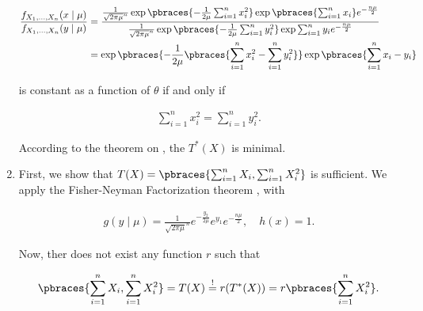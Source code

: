 \begin{solution}
\begin{enumerate}[label = (\alph*)]
    \begin{align*}
        \frac
        {
            f_{X_1, \dots, X_n}(x \mid \mu)
        }{
            f_{X_1, \dots, X_n}(y \mid \mu)
        }
        & =
        \frac
        {
            \frac{1}{\sqrt{2 \pi \mu}^n}
            \exp
            \pbraces
            {
                -\frac{1}{2 \mu}
                \sum_{i=1}^n
                    x_i^2
            }
            \exp \pbraces{\sum_{i=1}^n x_i}
            e^{-\frac{n \mu}{2}}
        }{
            \frac{1}{\sqrt{2 \pi \mu}^n}
            \exp
            \pbraces
            {
                -\frac{1}{2 \mu}
                \sum_{i=1}^n
                    y_i^2
            }
            \exp \sum_{i=1}^n y_i
            e^{-\frac{n \mu}{2}}
        } \\
        & =
        \exp
        \pbraces
        {
            -\frac{1}{2 \mu}
            \pbraces
            {
                \sum_{i=1}^n
                    x_i^2
                -
                \sum_{i=1}^n
                    y_i^2
            }
        }
        \exp \pbraces{\sum_{i=1}^n x_i - y_i}
    \end{align*}

    is constant as a function of $\theta$ if and only if

    \begin{align*}
        \sum_{i=1}^n
            x_i^2
        =
        \sum_{i=1}^n
            y_i^2.
    \end{align*}

    According to the theorem on \cite[lecture 8, slide 29]{EStat}, the $T^\ast(X)$ is minimal.

    \item First, we show that $T(X) = \pbraces{\sum_{i=1}^n X_i, \sum_{i=1}^n X_i^2}$ is sufficient.
    We apply the Fisher-Neyman Factorization theorem \cite[lecture 8, slide 13]{EStat}, with

    \begin{align*}
        g(y \mid \mu) = \frac{1}{\sqrt{2 \pi \mu}^n} e^{-\frac{y_2}{2 \mu}} e^{y_1} e^{-\frac{n \mu}{2}},
        \quad
        h(x) = 1.
    \end{align*}

    Now, ther does not exist any function $r$ such that

    \begin{align*}
        \pbraces{\sum_{i=1}^n X_i, \sum_{i=1}^n X_i^2}
        =
        T(X)
        \stackrel{!}{=}
        r(T^\ast(X))
        =
        r \pbraces{\sum_{i=1}^n X_i^2}.
    \end{align*}
    

\end{enumerate}
\end{solution}
